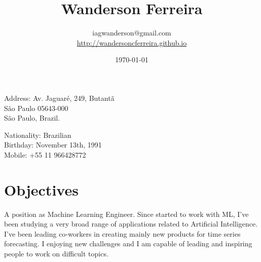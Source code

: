 \documentclass[10pt]{article}
\title{\bfseries\Huge Wanderson Ferreira}
\author{iagwanderson@gmail.com \\
\href{http://wandersoncferreira.github.io}{http://wandersoncferreira.github.io}}
\date{\today}
\begin{document}
\maketitle

\begin{center}
  \begin{minipage}{.7\textwidth}
    Address: Av. Jaguaré, 249, Butantã\\
    São Paulo 05643-000\\
    São Paulo, Brazil.
  \end{minipage}%
  \begin{minipage}{.5\textwidth}
    Nationality: Brazilian\\
    Birthday: November 13th, 1991\\
    Mobile: +55 11 966428772
  \end{minipage}
\end{center}

\section*{Objectives}
A position as Machine Learning Engineer. Since started to work with ML, I've been studying a very broad range of applications related to Artificial Intelligence. I've been leading co-workers in creating mainly new products for time series forecasting. I enjoying new challenges and I am capable of leading and inspiring people to work on difficult topics.
\end{document}
